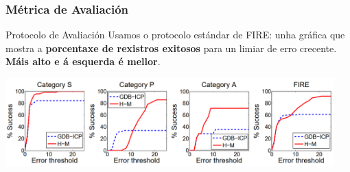 \documentclass[xcolor=dvipsnames]{beamer}
\begin{document}
\begin{frame}
\begin{center}
    \end{center}
\end{frame}

\begin{frame}
    \frametitle{Métrica de Avaliación}
    \begin{alertblock}{Protocolo de Avaliación}
        Usamos o protocolo estándar de FIRE: unha gráfica que mostra a \textbf{porcentaxe de rexistros exitosos} para un limiar de erro crecente. \textbf{Máis alto e á esquerda é mellor}.
    \end{alertblock}

    \includegraphics[width=0.95\textwidth]{../imaxes/fire_aval.png}



\end{frame}
\end{document}

